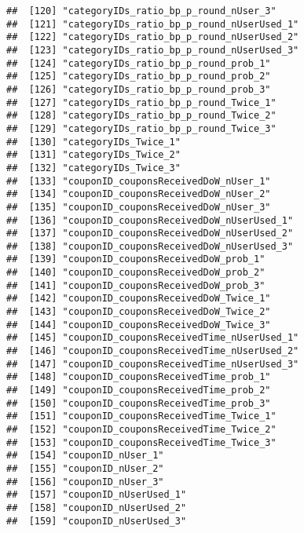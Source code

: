 \documentclass[10pt]{report}
\begin{document}
\begin{verbatim}
##  [120] "categoryIDs_ratio_bp_p_round_nUser_3"                 
##  [121] "categoryIDs_ratio_bp_p_round_nUserUsed_1"             
##  [122] "categoryIDs_ratio_bp_p_round_nUserUsed_2"             
##  [123] "categoryIDs_ratio_bp_p_round_nUserUsed_3"             
##  [124] "categoryIDs_ratio_bp_p_round_prob_1"                  
##  [125] "categoryIDs_ratio_bp_p_round_prob_2"                  
##  [126] "categoryIDs_ratio_bp_p_round_prob_3"                  
##  [127] "categoryIDs_ratio_bp_p_round_Twice_1"                 
##  [128] "categoryIDs_ratio_bp_p_round_Twice_2"                 
##  [129] "categoryIDs_ratio_bp_p_round_Twice_3"                 
##  [130] "categoryIDs_Twice_1"                                  
##  [131] "categoryIDs_Twice_2"                                  
##  [132] "categoryIDs_Twice_3"                                  
##  [133] "couponID_couponsReceivedDoW_nUser_1"                  
##  [134] "couponID_couponsReceivedDoW_nUser_2"                  
##  [135] "couponID_couponsReceivedDoW_nUser_3"                  
##  [136] "couponID_couponsReceivedDoW_nUserUsed_1"              
##  [137] "couponID_couponsReceivedDoW_nUserUsed_2"              
##  [138] "couponID_couponsReceivedDoW_nUserUsed_3"              
##  [139] "couponID_couponsReceivedDoW_prob_1"                   
##  [140] "couponID_couponsReceivedDoW_prob_2"                   
##  [141] "couponID_couponsReceivedDoW_prob_3"                   
##  [142] "couponID_couponsReceivedDoW_Twice_1"                  
##  [143] "couponID_couponsReceivedDoW_Twice_2"                  
##  [144] "couponID_couponsReceivedDoW_Twice_3"                  
##  [145] "couponID_couponsReceivedTime_nUserUsed_1"             
##  [146] "couponID_couponsReceivedTime_nUserUsed_2"             
##  [147] "couponID_couponsReceivedTime_nUserUsed_3"             
##  [148] "couponID_couponsReceivedTime_prob_1"                  
##  [149] "couponID_couponsReceivedTime_prob_2"                  
##  [150] "couponID_couponsReceivedTime_prob_3"                  
##  [151] "couponID_couponsReceivedTime_Twice_1"                 
##  [152] "couponID_couponsReceivedTime_Twice_2"                 
##  [153] "couponID_couponsReceivedTime_Twice_3"                 
##  [154] "couponID_nUser_1"                                     
##  [155] "couponID_nUser_2"                                     
##  [156] "couponID_nUser_3"                                     
##  [157] "couponID_nUserUsed_1"                                 
##  [158] "couponID_nUserUsed_2"                                 
##  [159] "couponID_nUserUsed_3"                                 

\end{verbatim}
\end{document}
